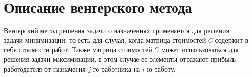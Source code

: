 \section{Описание венгерского метода}

Венгерский метод решения задачи о назначениях применяется для решения задачи минимизации, то есть для случая, когда матрица стоимостей $C$ содержит в себе стоимости работ. Также матрица стоимостей $C$ может использоваться для решения задачи максимизации, в этом случае ее элементы отражают прибыль работодателя от назначения $j$-го работника на $i$-ю работу. 









